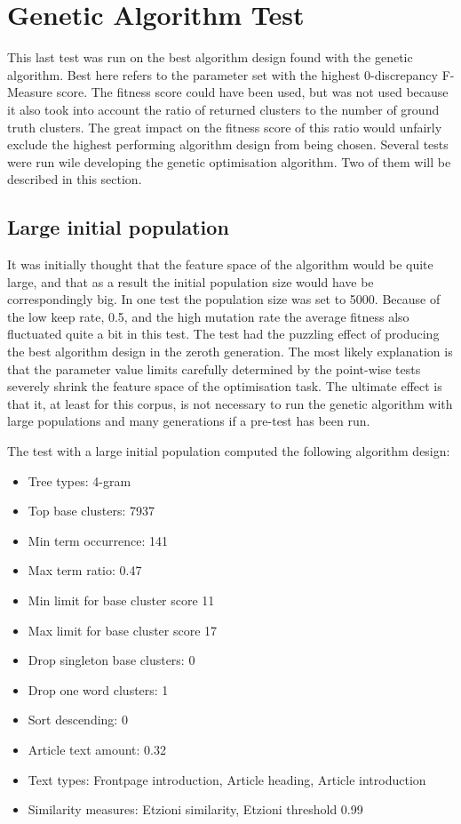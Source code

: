 \section{Genetic Algorithm Test}
This last test was run on the best algorithm design found with the genetic algorithm. Best here refers to the parameter set with the highest 0-discrepancy F-Measure score. The fitness score could have been used, but was not used because it also took into account the ratio of returned clusters to the number of ground truth clusters. The great impact on the fitness score of this ratio would unfairly exclude the highest performing algorithm design from being chosen. Several tests were run wile developing the genetic optimisation algorithm. Two of them will be described in this section.

\subsection{Large initial population}
It was initially thought that the feature space of the algorithm would be quite large, and that as a result the initial population size would have be correspondingly big. In one test the population size was set to 5000. Because of the low keep rate, 0.5, and the high mutation rate the average fitness also fluctuated quite a bit in this test. The test had the puzzling effect of producing the best algorithm design in the zeroth generation. The most likely explanation is that the parameter value limits carefully determined by the point-wise tests severely shrink the feature space of the optimisation task. The ultimate effect is that it, at least for this corpus, is not necessary to run the genetic algorithm with large populations and many generations if a pre-test has been run.

The test with a large initial population computed the following algorithm design:

\begin{itemize}
  \item Tree types: 4-gram
  \item Top base clusters: 7937
  \item Min term occurrence: 141
  \item Max term ratio: 0.47
  \item Min limit for base cluster score 11
  \item Max limit for base cluster score 17
  \item Drop singleton base clusters: 0
  \item Drop one word clusters: 1
  \item Sort descending: 0
  \item Article text amount: 0.32
  \item Text types: Frontpage introduction, Article heading, Article introduction
  \item Similarity measures: Etzioni similarity, Etzioni threshold 0.99
\end{itemize}

